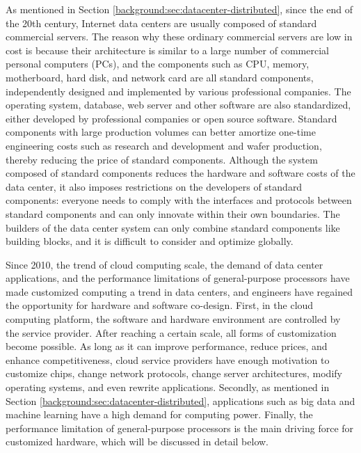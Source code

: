 As mentioned in Section \ref{background:sec:datacenter-distributed}, since the end of the 20th century, Internet data centers are usually composed of standard commercial servers. The reason why these ordinary commercial servers are low in cost is because their architecture is similar to a large number of commercial personal computers (PCs), and the components such as CPU, memory, motherboard, hard disk, and network card are all standard components, independently designed and implemented by various professional companies. The operating system, database, web server and other software are also standardized, either developed by professional companies or open source software. Standard components with large production volumes can better amortize one-time engineering costs such as research and development and wafer production, thereby reducing the price of standard components. Although the system composed of standard components reduces the hardware and software costs of the data center, it also imposes restrictions on the developers of standard components: everyone needs to comply with the interfaces and protocols between standard components and can only innovate within their own boundaries. The builders of the data center system can only combine standard components like building blocks, and it is difficult to consider and optimize globally.

Since 2010, the trend of cloud computing scale, the demand of data center applications, and the performance limitations of general-purpose processors have made customized computing a trend in data centers, and engineers have regained the opportunity for hardware and software co-design. First, in the cloud computing platform, the software and hardware environment are controlled by the service provider. After reaching a certain scale, all forms of customization become possible. As long as it can improve performance, reduce prices, and enhance competitiveness, cloud service providers have enough motivation to customize chips, change network protocols, change server architectures, modify operating systems, and even rewrite applications. Secondly, as mentioned in Section \ref{background:sec:datacenter-distributed}, applications such as big data and machine learning have a high demand for computing power. Finally, the performance limitation of general-purpose processors is the main driving force for customized hardware, which will be discussed in detail below.

